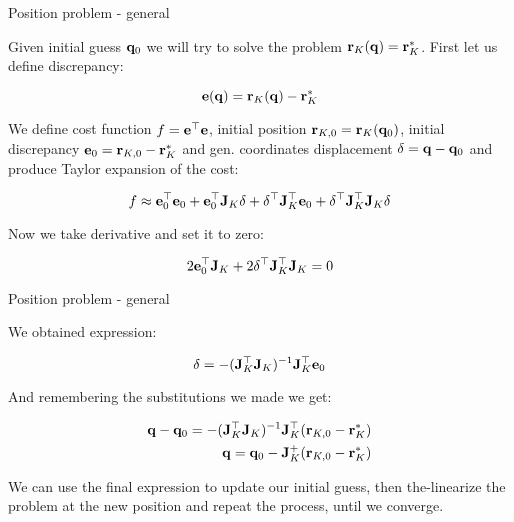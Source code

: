 \documentclass{beamer}
\begin{document}
\begin{frame}{Position problem - general}
	\begin{flushleft}
		
		Given initial guess $\mathbf{q}_0$ we will try to solve the problem $\mathbf{r}_K(\mathbf{q}) = \mathbf{r}_K^*$. First let us define discrepancy:
		
		\begin{equation}
			\mathbf{e}(\mathbf{q}) = \mathbf{r}_K(\mathbf{q}) - \mathbf{r}_K^*
		\end{equation}		
	
		We define cost function $f =\mathbf{e}^\top \mathbf{e}$, initial position $\mathbf{r}_{K, 0} = \mathbf{r}_K(\mathbf{q}_0)$, initial discrepancy $\mathbf{e}_0 =  \mathbf{r}_{K, 0} - \mathbf{r}_K^*$ and gen. coordinates displacement $\delta = \mathbf{q} - \mathbf{q}_0$ and produce Taylor expansion of the cost:
		
		\begin{equation}
			f \approx \mathbf{e}_0^\top \mathbf{e}_0 
			+
			\mathbf{e}_0^\top \mathbf{J}_K \delta
			+
			 \delta ^\top \mathbf{J}_K^\top \mathbf{e}_0
			  +
			  \delta ^\top \mathbf{J}_K^\top \mathbf{J}_K \delta
		\end{equation}	
	
	Now we take  derivative and set it to zero:
	
			\begin{equation}
		2 \mathbf{e}_0^\top \mathbf{J}_K
		+
		2 \delta ^\top \mathbf{J}_K^\top \mathbf{J}_K = 0
	\end{equation}	
		
	\end{flushleft}
\end{frame}



\begin{frame}{Position problem - general}
	\begin{flushleft}
		
		We obtained expression:
		
		\begin{equation}
			\delta = -(\mathbf{J}_K^\top \mathbf{J}_K)^{-1} \mathbf{J}_K^\top \mathbf{e}_0
		\end{equation}	
	
	And remembering the substitutions we made we get:
	
	\begin{align}
		\mathbf{q} - \mathbf{q}_0 = -(\mathbf{J}_K^\top \mathbf{J}_K)^{-1} \mathbf{J}_K^\top (\mathbf{r}_{K, 0} - \mathbf{r}_K^*) \\
		\mathbf{q} = \mathbf{q}_0 - \mathbf{J}_K^+(\mathbf{r}_{K, 0} - \mathbf{r}_K^*)
	\end{align}	

	We can use the final expression to update our initial guess, then the-linearize the problem at the new position and repeat the process, until we converge.
		
	\end{flushleft}
\end{frame}
\end{document}
